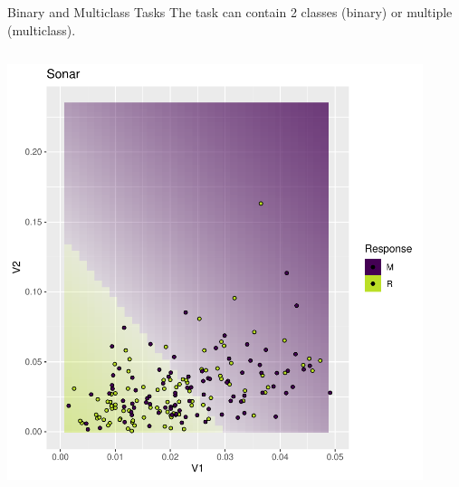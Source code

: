 \documentclass[11pt,compress,t,notes=noshow, xcolor=table]{beamer}
\begin{document}
\begin{vbframe}{Binary and Multiclass Tasks}
The task can contain 2 classes (binary) or multiple (multiclass).
\begin{columns}[T]
  \begin{column}{0.5\textwidth}
\begin{knitrout}\scriptsize
{}\color{fgcolor}

{\centering \includegraphics[width=0.95\textwidth]{figure/reg_class_task_1} 

}



\end{knitrout}
  \end{column}
  \begin{column}{0.5\textwidth}
\begin{knitrout}\scriptsize
{}\color{fgcolor}


\end{knitrout}
\end{column}
\end{columns}
\end{vbframe}
\end{document}
